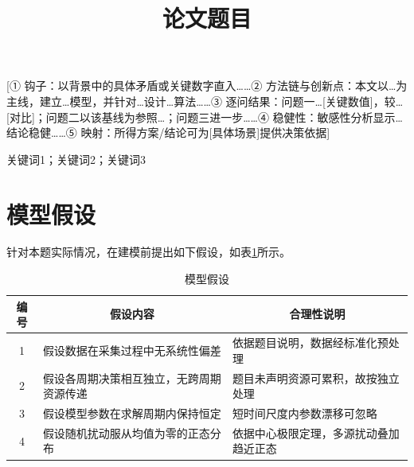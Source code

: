\documentclass[12pt,a4paper]{article}
\begin{document}
\title{\heiti\fontsize{16}{20}\selectfont 论文题目}
\author{}
\date{}
\maketitle
\thispagestyle{fancy}  %

\vspace{0.3cm}

\par
\setlength{\parindent}{2em}
\normalsize
[① 钩子：以背景中的具体矛盾或关键数字直入……② 方法链与创新点：本文以…为主线，建立…模型，并针对…设计…算法……③ 逐问结果：问题一…[关键数值]，较…[对比]；问题二以该基线为参照…；问题三进一步……④ 稳健性：敏感性分析显示…结论稳健……⑤ 映射：所得方案/结论可为[具体场景]提供决策依据]

\vspace{0.2cm}

关键词1；关键词2；关键词3

\newpage

\section{模型假设}

针对本题实际情况，在建模前提出如下假设，如表\ref{tab:assumptions}所示。

\begin{table}[H]
\centering
\caption{模型假设}
\label{tab:assumptions}
\begin{tabularx}{\textwidth}{c X X}
\toprule
编号 & \multicolumn{1}{c}{假设内容} & \multicolumn{1}{c}{合理性说明} \\
\midrule
1 & 假设数据在采集过程中无系统性偏差 & 依据题目说明，数据经标准化预处理 \\
2 & 假设各周期决策相互独立，无跨周期资源传递 & 题目未声明资源可累积，故按独立处理 \\
3 & 假设模型参数在求解周期内保持恒定 & 短时间尺度内参数漂移可忽略\cite{ref1} \\
4 & 假设随机扰动服从均值为零的正态分布 & 依据中心极限定理，多源扰动叠加趋近正态 \\
\bottomrule
\end{tabularx}
\end{table}
\end{document}
